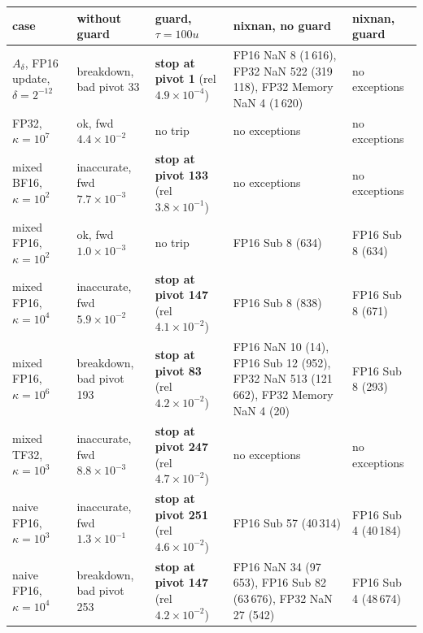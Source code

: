 \begin{tabular}{p{3.0cm}p{2.5cm}p{2.5cm}p{3.6cm}p{2.6cm}}
\toprule
case & without guard & guard, $\tau=100u$ & nixnan, no guard & nixnan, guard\\
\midrule
$A_\delta$, FP16 update, $\delta=2^{-12}$ & breakdown, bad pivot 33 & \textbf{stop at pivot 1} (rel $4.9\!\times\!10^{-4}$) & FP16 NaN 8 (1\,616), FP32 NaN 522 (319\,118), FP32 Memory NaN 4 (1\,620) & no exceptions\\
FP32, $\kappa=10^{7}$ & ok, fwd $4.4\!\times\!10^{-2}$ & no trip & no exceptions & no exceptions\\
mixed BF16, $\kappa=10^{2}$ & inaccurate, fwd $7.7\!\times\!10^{-3}$ & \textbf{stop at pivot 133} (rel $3.8\!\times\!10^{-1}$) & no exceptions & no exceptions\\
mixed FP16, $\kappa=10^{2}$ & ok, fwd $1.0\!\times\!10^{-3}$ & no trip & FP16 Sub 8 (634) & FP16 Sub 8 (634)\\
mixed FP16, $\kappa=10^{4}$ & inaccurate, fwd $5.9\!\times\!10^{-2}$ & \textbf{stop at pivot 147} (rel $4.1\!\times\!10^{-2}$) & FP16 Sub 8 (838) & FP16 Sub 8 (671)\\
mixed FP16, $\kappa=10^{6}$ & breakdown, bad pivot 193 & \textbf{stop at pivot 83} (rel $4.2\!\times\!10^{-2}$) & FP16 NaN 10 (14), FP16 Sub 12 (952), FP32 NaN 513 (121\,662), FP32 Memory NaN 4 (20) & FP16 Sub 8 (293)\\
mixed TF32, $\kappa=10^{3}$ & inaccurate, fwd $8.8\!\times\!10^{-3}$ & \textbf{stop at pivot 247} (rel $4.7\!\times\!10^{-2}$) & no exceptions & no exceptions\\
naive FP16, $\kappa=10^{3}$ & inaccurate, fwd $1.3\!\times\!10^{-1}$ & \textbf{stop at pivot 251} (rel $4.6\!\times\!10^{-2}$) & FP16 Sub 57 (40\,314) & FP16 Sub 4 (40\,184)\\
naive FP16, $\kappa=10^{4}$ & breakdown, bad pivot 253 & \textbf{stop at pivot 147} (rel $4.2\!\times\!10^{-2}$) & FP16 NaN 34 (97\,653), FP16 Sub 82 (63\,676), FP32 NaN 27 (542) & FP16 Sub 4 (48\,674)\\
\bottomrule
\end{tabular}
